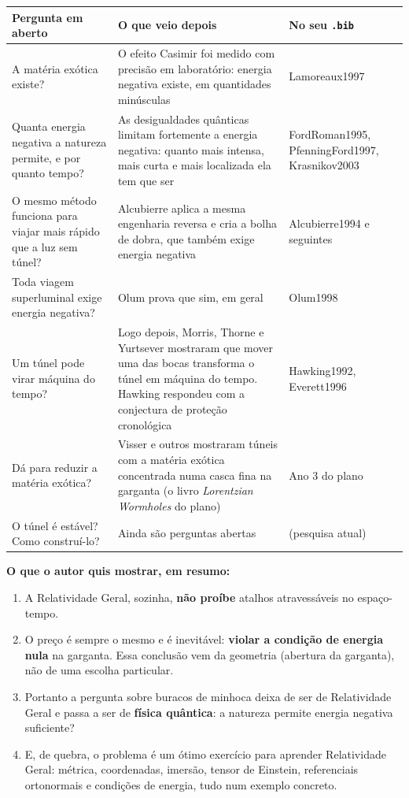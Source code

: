\documentclass[11pt,a4paper]{article}
\begin{document}
\begin{center}
\small
\begin{tabularx}{\linewidth}{>{\raggedright\arraybackslash}p{3.8cm} Y >{\raggedright\arraybackslash}p{3.0cm}}
\toprule
Pergunta em aberto & O que veio depois & No seu \texttt{.bib} \\
\midrule
A matéria exótica existe? & O efeito Casimir foi medido com precisão em laboratório: energia negativa existe, em quantidades minúsculas & Lamoreaux1997 \\
Quanta energia negativa a natureza permite, e por quanto tempo? & As desigualdades quânticas limitam fortemente a energia negativa: quanto mais intensa, mais curta e mais localizada ela tem que ser & FordRoman1995, PfenningFord1997, Krasnikov2003 \\
O mesmo método funciona para viajar mais rápido que a luz sem túnel? & Alcubierre aplica a mesma engenharia reversa e cria a bolha de dobra, que também exige energia negativa & Alcubierre1994 e seguintes \\
Toda viagem superluminal exige energia negativa? & Olum prova que sim, em geral & Olum1998 \\
Um túnel pode virar máquina do tempo? & Logo depois, Morris, Thorne e Yurtsever mostraram que mover uma das bocas transforma o túnel em máquina do tempo. Hawking respondeu com a conjectura de proteção cronológica & Hawking1992, Everett1996 \\
Dá para reduzir a matéria exótica? & Visser e outros mostraram túneis com a matéria exótica concentrada numa casca fina na garganta (o livro \emph{Lorentzian Wormholes} do plano) & Ano 3 do plano \\
O túnel é estável? Como construí-lo? & Ainda são perguntas abertas & (pesquisa atual) \\
\bottomrule
\end{tabularx}
\end{center}

\textbf{O que o autor quis mostrar, em resumo:}
\begin{enumerate}
\item A Relatividade Geral, sozinha, \textbf{não proíbe} atalhos atravessáveis no espaço-tempo.
\item O preço é sempre o mesmo e é inevitável: \textbf{violar a condição de energia nula} na garganta. Essa conclusão
vem da geometria (abertura da garganta), não de uma escolha particular.
\item Portanto a pergunta sobre buracos de minhoca deixa de ser de Relatividade Geral e passa a ser de \textbf{física
quântica}: a natureza permite energia negativa suficiente?
\item E, de quebra, o problema é um ótimo exercício para aprender Relatividade Geral: métrica, coordenadas, imersão,
tensor de Einstein, referenciais ortonormais e condições de energia, tudo num exemplo concreto.
\end{enumerate}
\end{document}
